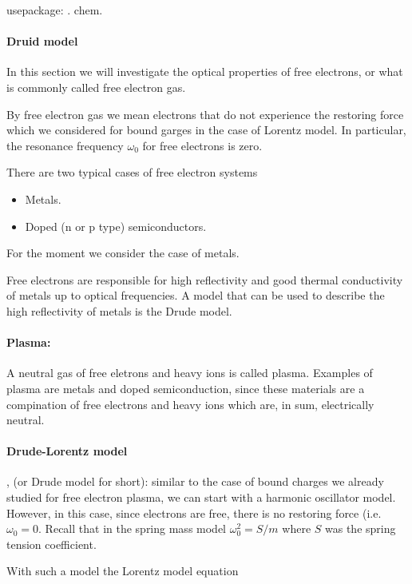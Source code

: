 
usepackage: \ce{}. chem.

\paragraph{Druid model}

In this section we will investigate the optical properties of free electrons, or what is commonly called free electron gas.

By free electron gas we mean electrons that do not experience the restoring force which we considered for bound garges in the case of Lorentz model.  In particular, the resonance frequency \( \omega_0 \) for free electrons is zero.

There are two typical cases of free electron systems 

\begin{itemize}[a]
\item Metals.
\item Doped (n or p type) semiconductors.
\end{itemize}

For the moment we consider the case of metals.

Free electrons are responsible for high reflectivity and good thermal conductivity of metals up to optical frequencies.  A model that can be used to describe the high reflectivity of metals is the Drude model.

\paragraph{Plasma:} A neutral gas of free eletrons and heavy ions is called plasma.  Examples of plasma are metals and doped semiconduction, since these materials are a compination of free electrons and heavy ions which are, in sum, electrically neutral.

\paragraph{Drude-Lorentz model}, (or Drude model for short): similar to the case of bound charges we already studied for free electron plasma, we can start with a harmonic oscillator model.  However, in this case, since electrons are free, there is no restoring force (i.e. \(\omega_0 = 0 \).  Recall that in the spring mass model \( \omega_0^2 = S/m \) where \( S \) was the spring tension coefficient.

With such a model the Lorentz model equation

